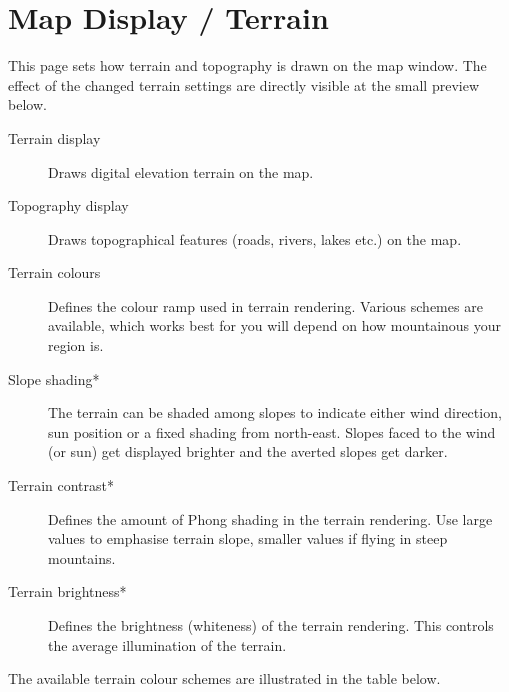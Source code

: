 \section{Map Display / Terrain}\label{sec:terrain-display}

This page sets how terrain and topography is drawn on the map window. The effect of the 
changed terrain settings are directly visible at the small preview below.

\begin{description}
\item[Terrain display]  Draws digital elevation terrain on the map.
\item[Topography display]  Draws topographical features (roads, rivers, lakes etc.) on
 the map.
\item[Terrain colours]  Defines the colour ramp used in terrain rendering.  Various 
 schemes are available, which works best for you will depend on how mountainous your region is.
\item[Slope shading*]  \label{conf:shading} The terrain can be shaded among slopes 
 to indicate either wind direction, sun position or a fixed shading from north-east. 
 Slopes faced to the wind (or sun) get displayed brighter and the averted slopes get darker.
\item[Terrain contrast*]  Defines the amount of Phong shading in the terrain rendering. 
 Use large values to emphasise terrain slope, smaller values if flying in steep mountains.
\item[Terrain brightness*]  Defines the brightness (whiteness) of the terrain rendering. 
 This controls the average illumination of the terrain.
\end{description}


The available terrain colour schemes are illustrated in the table below.

